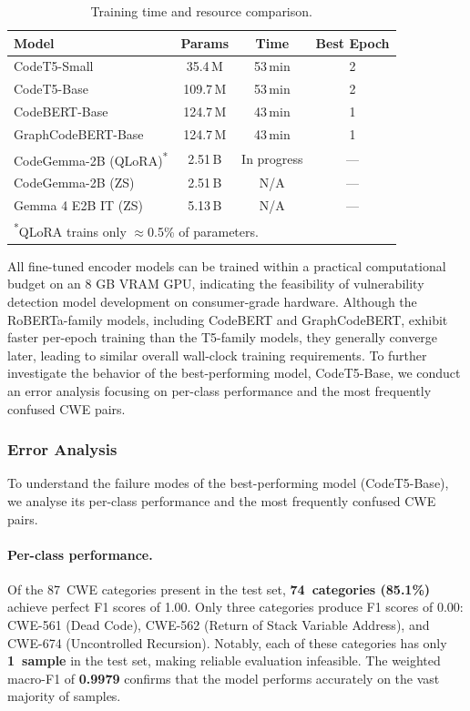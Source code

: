 \documentclass[conference]{IEEEtran}
\begin{document}
\begin{table}[t]
\centering
\caption{Training time and resource comparison.}
\label{tab:training_time}
\begin{tabular}{lccc}
\hline
\textbf{Model} & \textbf{Params} & \textbf{Time} & \textbf{Best Epoch} \\
\hline
CodeT5-Small       & 35.4\,M  & 53\,min & 2 \\
CodeT5-Base        & 109.7\,M & 53\,min & 2 \\
CodeBERT-Base      & 124.7\,M & 43\,min & 1 \\
GraphCodeBERT-Base & 124.7\,M & 43\,min & 1 \\
\hline
CodeGemma-2B (QLoRA)\textsuperscript{*} & 2.51\,B & In progress & --- \\
CodeGemma-2B (ZS)  & 2.51\,B  & N/A   & --- \\
Gemma 4 E2B IT (ZS)& 5.13\,B  & N/A   & --- \\
\hline
\multicolumn{4}{l}{\footnotesize\textsuperscript{*}QLoRA trains only $\approx$0.5\% of parameters.} \\
\end{tabular}
\end{table}

All fine-tuned encoder models can be trained within a practical computational budget on an 8 GB VRAM GPU, indicating the feasibility of vulnerability detection model development on consumer-grade hardware. Although the RoBERTa-family models, including CodeBERT and GraphCodeBERT, exhibit faster per-epoch training than the T5-family models, they generally converge later, leading to similar overall wall-clock training requirements. To further investigate the behavior of the best-performing model, CodeT5-Base, we conduct an error analysis focusing on per-class performance and the most frequently confused CWE pairs.

\subsubsection{Error Analysis}
To understand the failure modes of the best-performing model (CodeT5-Base),
we analyse its per-class performance and the most frequently confused CWE
pairs.

\paragraph{Per-class performance.}
Of the 87~CWE categories present in the test set, \textbf{74~categories
(85.1\%)} achieve perfect F1 scores of 1.00.  Only three categories produce
F1 scores of 0.00: CWE-561 (Dead Code), CWE-562 (Return of Stack Variable
Address), and CWE-674 (Uncontrolled Recursion).  Notably, each of these
categories has only \textbf{1~sample} in the test set, making reliable
evaluation infeasible.  The weighted macro-F1 of \textbf{0.9979} confirms
that the model performs accurately on the vast majority of samples.
\end{document}
